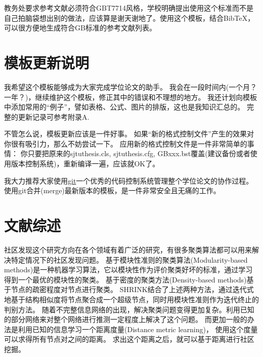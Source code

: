 教务处要求参考文献必须符合GBT7714风格，学校明确提出使用这个标准而不是自己拍脑袋想出别的做法，应该算是谢天谢地了。使用这个模板，结合BibTeX，可以很方便地生成符合GB标准的参考文献列表。

\section{模板更新说明}
\label{sec:update}

我希望这个模板能够成为大家完成学位论文的助手。
我会在一段时间内(一个月？一年？)，继续维护这个模板，修正其中的错误和不理想的地方。
我还计划向模板中添加常用的``例子''，譬如表格、公式、图片的排版，这也是我知识汇总的。
完整的更新记录可参考附录A.

不管怎么说，模板更新应该是一件好事。
如果``新的格式控制文件''产生的效果对你很有吸引力，那么不妨尝试一下。
应用新的格式控制文件是一件非常简单的事情：
你只要把原来的sjtuthesis.cls, sjtuthesis.cfg, GBxxx.bst覆盖(建议备份或者使用版本控制系统)，重新编译一遍，应该就OK了。

我大力推荐大家使用\href{http://git-scm.com}{git}\cndash{}一个优秀的代码控制系统\cndash{}管理整个学位论文的协作过程。使用git合并(merge)最新版本的模板，是一件非常安全且无痛的工作。

\section{文献综述}
\label{sec:reference-overview}

社区发现这个研究方向在各个领域有着广泛的研究，有很多聚类算法都可以用来解决特定情况下的社区发现问题。
基于模块性准则的聚类算法(Modularity-based methods)是一种机器学习算法，它以模块性作为评价聚类好坏的标准，通过学习得到一个最优的模块性的聚类。
基于密度的聚类方法(Density-based methods)基于节点的疏密程度对节点进行聚类。
SHRINK结合了上述两种方法，通过迭代式地基于结构相似度将节点聚合成一个超级节点，同时用模块性准则作为迭代终止的判别方法。
随着不完整信息网络的出现，解决聚类问题变得更加复杂。利用已知的部分网络来对整个网络进行推测一定程度上解决了这个问题。
而更加一般的办法是利用已知的信息学习一个距离度量(Distance metric learning)，
使用这个度量可以求得所有节点对之间的距离。
求出这个距离之后，就可以基于距离进行社区挖掘。
